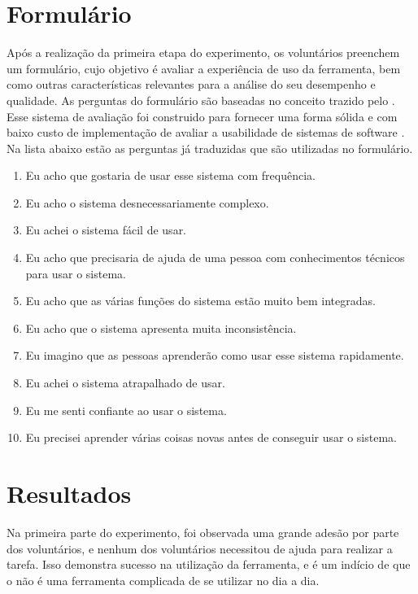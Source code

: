 \documentclass[12pt]{tcc}
\begin{document}
\section{Formulário}
\label{section:parte-2-formulario}

Após a realização da primeira etapa do experimento, os voluntários preenchem um formulário, cujo objetivo é avaliar a experiência de uso da ferramenta, bem como outras características relevantes para a análise do seu desempenho e qualidade. As perguntas do formulário são baseadas no conceito trazido pelo . Esse sistema de avaliação foi construido para fornecer uma forma sólida e com baixo custo de implementação de avaliar a usabilidade de sistemas de software \citep{brooke1995sus}. Na lista abaixo estão as perguntas já traduzidas que são utilizadas no formulário.

\begin{enumerate}
	\itemsep 0em 

	\item Eu acho que gostaria de usar esse sistema com frequência.
	\item Eu acho o sistema desnecessariamente complexo.
	\item Eu achei o sistema fácil de usar.
	\item Eu acho que precisaria de ajuda de uma pessoa com conhecimentos técnicos para usar o sistema.
	\item Eu acho que as várias funções do sistema estão muito bem integradas.
	\item Eu acho que o sistema apresenta muita inconsistência.
	\item Eu imagino que as pessoas aprenderão como usar esse sistema rapidamente.
	\item Eu achei o sistema atrapalhado de usar.
	\item Eu me senti confiante ao usar o sistema.
	\item Eu precisei aprender várias coisas novas antes de conseguir usar o sistema.
\end{enumerate}


\section{Resultados}
\label{section:resultados}

Na primeira parte do experimento, foi observada uma grande adesão por parte dos voluntários, e nenhum dos voluntários necessitou de ajuda para realizar a tarefa. Isso demonstra sucesso na utilização da ferramenta, e é um indício de que o  não é uma ferramenta complicada de se utilizar no dia a dia.
\end{document}
